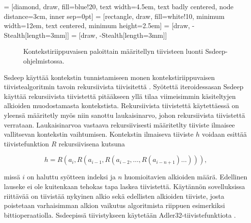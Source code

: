 \usetikzlibrary{shapes,arrows}
\usetikzlibrary{arrows.meta}
 = [diamond, draw, fill=blue!20, 
    text width=4.5em, text badly centered, node distance=3cm, inner sep=0pt]
 = [rectangle, draw, fill=white!10,
    minimum width=12em, text centered, minimum height=2.5em]
 = [draw, -{Stealth[length=3mm]}]
\tikzstyle{->} = [draw, -{Stealth[length=3mm]}]
    
\begin{figure}[h]
  \centering
  \caption{Kontekstiriippuvaisen paloittain määritellyn tiivisteen luonti Ssdeep-ohjelmistossa.}
\end{figure}

Ssdeep käyttää kontekstin tunnistamiseen monen kontekstiriippuvaisen
tiivistealgoritmin tavoin rekursiivista tiivisitettä \citep{kornblum06}.
Syötettä iteroidessasan Ssdeep käyttää rekursiivista tiivistettä pitääkseen
yllä tilaa viimeisimmin käsiteltyjen alkioiden muodostamasta kontekstista.
Rekursiivista tiivistettä käytettäessä on yleensä määritetly myös niin sanottu
laukaisinarvo, johon rekursiivista tiivistettä verrataan. Laukaisinarvoa
vastaava rekursiivisesti määritetlty tiiviste ilmaisee vallitsevan kontekstin
vaihtumisen. Kontekstin ilmaiseva tiiviste $h$ voidaan esittää tiivistefunktion
$R$ rekursiivisena kutsuna

\[
  h = R(a_i, R(a_{i - 1}, R(a_{i - 2}, \dots, R(a_{i - n + 1}) \dots))),
\]                                                                     

missä $i$ on haluttu syötteen indeksi ja $n$ huomioitavien alkioiden määrä.
Edellinen lauseke ei ole kuitenkaan tehokas tapa laskea tiivistettä. Käytännön
sovelluksissa riittävää on tiivistää nykyinen alkio sekä edellisten alkioiden tiiviste, josta poistetaan varhaisimman alkion vaikutus algoritmista riippuen esimerkiksi
bittioperaatiolla. Ssdeepissä tiivistykseen käytetään Adler32-tiivistefunktiota \citep{kornblum06}.

